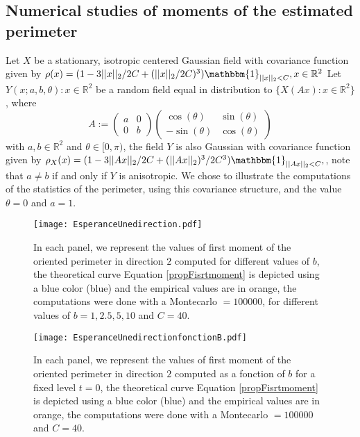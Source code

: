 \documentclass[12pt]{article}
\theoremstyle{Theorem}
\theoremstyle{definition}
\newcounter{Ax}
\begin{document}
\subsection{Numerical studies of moments of the estimated perimeter}
Let $X$ be a stationary, isotropic centered Gaussian field with covariance function given by $\rho(x) = (1 -3||x||_{2}/2C + (||x||_{2}/2C)^{3})\mathbbm{1}_{||x||_{2} < C}, x \in \mathbb{R}^2$
Let ${Y(x; a, b, \theta): x \in \mathbb{R}^{2}}$ be a random field equal in distribution to  $\{X(Ax): x\in \mathbb{R}^{2}\}$, where 
\begin{equation}
A:= \begin{pmatrix} a & 0 \\ 0 & b\end{pmatrix} \begin{pmatrix} \cos(\theta) & \sin(\theta) \\ -\sin(\theta) & \cos(\theta)\end{pmatrix} 
\end{equation}
with $a, b \in \mathbb{R}^{2}$ and $\theta \in [0, \pi)$, the field $Y$ is also Gaussian with covariance function given by  $\rho_{X}(x) = (1 - 3||Ax||_{2}/2C + (||Ax||_{2})^{3}/2C^{3})\mathbbm{1}_{||Ax||_{2} < C},$, note that $a\neq b$ if and only if $Y$ is anisotropic. We chose to illustrate the computations of the statistics of the perimeter, using this covariance structure, and the value $\theta = 0$ and $a = 1$. 
\begin{figure}[H]
  \centering
    {\texttt{[image: EsperanceUnedirection.pdf]}}
    \hspace{0.2cm}
 \caption{In each panel, we represent the values of first moment of the oriented perimeter in direction $2$ computed for different values of $b$, the theoretical curve Equation \eqref{propFisrtmoment} is depicted using a blue color (blue) and the empirical values are in orange, the computations were done with a Montecarlo $= 100000$, for different values of $b = 1, 2.5, 5, 10$ and $C = 40$. }
\label{fig2}
\end{figure}

\begin{figure}[H]
  \centering
    {\texttt{[image: EsperanceUnedirectionfonctionB.pdf]}}
    \hspace{0.2cm}
 \caption{In each panel, we represent the values of first moment of the oriented perimeter in direction $2$ computed as a fonction of $b$ for a fixed level $t = 0$, the theoretical curve Equation \eqref{propFisrtmoment} is depicted using a blue color (blue) and the empirical values are in orange, the computations were done with a Montecarlo $= 100000$ and $C = 40$.}
\label{fig2}
\end{figure}
\end{document}
